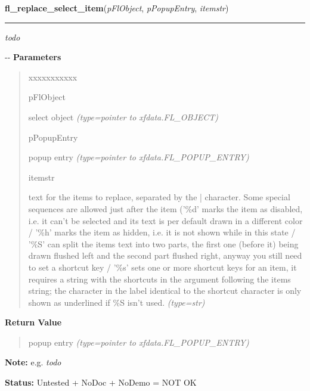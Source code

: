 \hspace{.8\funcindent}\begin{boxedminipage}{\funcwidth}

    \raggedright \textbf{fl\_replace\_select\_item}(\textit{pFlObject}, \textit{pPopupEntry}, \textit{itemstr})

    \vspace{-1.5ex}

    \rule{\textwidth}{0.5\fboxrule}
\setlength{\parskip}{2ex}

\emph{todo}

-{}-
\setlength{\parskip}{1ex}
      \textbf{Parameters}
      \vspace{-1ex}

      \begin{quote}
        \begin{Ventry}{xxxxxxxxxxx}

          \item[pFlObject]


select object
            {\it (type=pointer to xfdata.FL\_OBJECT)}

          \item[pPopupEntry]


popup entry
            {\it (type=pointer to xfdata.FL\_POPUP\_ENTRY)}

          \item[itemstr]


text for the items to replace, separated by the | character. Some
special sequences are allowed just after the item ('\%d' marks the item
as disabled, i.e. it can't be selected and its text is per default
drawn in a different color / '\%h' marks the item as hidden, i.e. it
is not shown while in this state / '\%S' can split the items text into
two parts, the first one (before it) being drawn flushed left and the
second part flushed right, anyway you still need to set a shortcut key
/ '\%s' sets one or more shortcut keys for an item, it requires a
string with the shortcuts in the argument following the items string;
the character in the label identical to the shortcut character is only
shown as underlined if \%S isn't used.
            {\it (type=str)}

        \end{Ventry}

      \end{quote}

      \textbf{Return Value}
    \vspace{-1ex}

      \begin{quote}

popup entry
      {\it (type=pointer to xfdata.FL\_POPUP\_ENTRY)}

      \end{quote}

\textbf{Note:} 
e.g. \emph{todo}


\textbf{Status:} 
Untested + NoDoc + NoDemo = NOT OK


    \end{boxedminipage}

